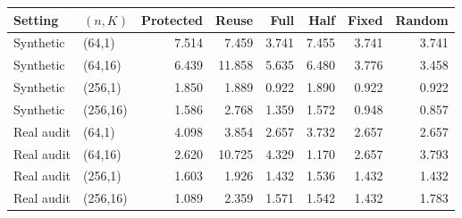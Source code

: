 \begin{tabular}{llrrrrrr}\toprule
Setting & $(n,K)$ & Protected & Reuse & Full & Half & Fixed & Random\\\midrule
Synthetic & (64,1) & 7.514 & 7.459 & 3.741 & 7.455 & 3.741 & 3.741\\
Synthetic & (64,16) & 6.439 & 11.858 & 5.635 & 6.480 & 3.776 & 3.458\\
Synthetic & (256,1) & 1.850 & 1.889 & 0.922 & 1.890 & 0.922 & 0.922\\
Synthetic & (256,16) & 1.586 & 2.768 & 1.359 & 1.572 & 0.948 & 0.857\\
Real audit & (64,1) & 4.098 & 3.854 & 2.657 & 3.732 & 2.657 & 2.657\\
Real audit & (64,16) & 2.620 & 10.725 & 4.329 & 1.170 & 2.657 & 3.793\\
Real audit & (256,1) & 1.603 & 1.926 & 1.432 & 1.536 & 1.432 & 1.432\\
Real audit & (256,16) & 1.089 & 2.359 & 1.571 & 1.542 & 1.432 & 1.783\\
\bottomrule\end{tabular}
